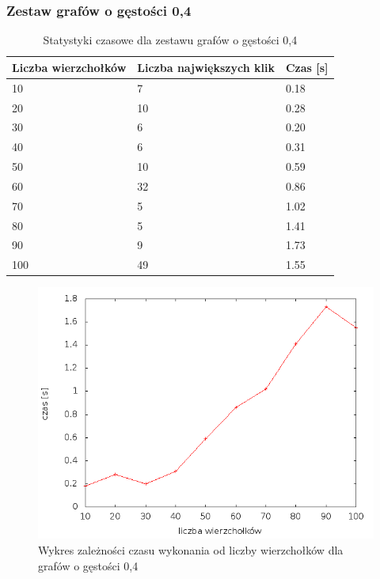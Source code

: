 \documentclass[12pt, a4paper]{article}
\begin{document}
\subsubsection*{Zestaw grafów o gęstości 0,4}
\begin{table}[H]
\caption{Statystyki czasowe dla zestawu grafów o gęstości 0,4}
\begin{center}
    \begin{tabular}{|l|l|l|}
    \hline
    Liczba wierzchołków & Liczba największych klik & Czas [s] \\ \hline
    10 & 7 & 0.18 \\ \hline
    20 & 10 & 0.28 \\ \hline
    30 & 6 & 0.20 \\ \hline
    40 & 6 & 0.31 \\ \hline
    50 & 10 & 0.59 \\ \hline
    60 & 32 & 0.86 \\ \hline
    70 & 5 & 1.02 \\ \hline
    80 & 5 & 1.41 \\ \hline
    90 & 9 & 1.73 \\ \hline
    100 & 49 & 1.55 \\ \hline
    \end{tabular}
\end{center}
\end{table}

\begin{figure}[h]
    \begin{center}
	\includegraphics[scale=0.5]{results/img/den/den_04.png}
	\caption{Wykres zależności czasu wykonania od liczby wierzchołków dla grafów o gęstości 0,4}
    \end{center}
\end{figure}
\end{document}
